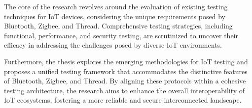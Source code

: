 The core of the research revolves around the evaluation of existing testing techniques for IoT devices, considering the unique requirements posed by Bluetooth, Zigbee, and Thread. Comprehensive testing strategies, including functional, performance, and security testing, are scrutinized to uncover their efficacy in addressing the challenges posed by diverse IoT environments.

Furthermore, the thesis explores the emerging methodologies for IoT testing and proposes a unified testing framework that accommodates the distinctive features of Bluetooth, Zigbee, and Thread. By aligning these protocols within a cohesive testing architecture, the research aims to enhance the overall interoperability of IoT ecosystems, fostering a more reliable and secure interconnected landscape.



\vfill
\cleardoublepage

\selectthesislanguage

\setcounter{romanPage}{\value{page}}
